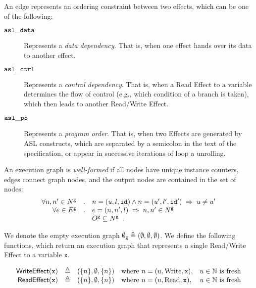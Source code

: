 An edge represents an ordering constraint between two effects, which can be one of the following:
\hypertarget{def-asldata}{}
\begin{description}
\item[$\mathtt{asl\_data}$] Represents a \emph{data dependency}.
That is, when one effect hands over its data to another effect.
\hypertarget{def-aslctrl}{}
\item[$\mathtt{asl\_ctrl}$] Represents a \emph{control dependency}.
That is, when a Read Effect to a variable determines the flow of control (e.g., which condition of a branch is taken),
which then leads to another Read/Write Effect.
\hypertarget{def-aslpo}{}
\item[$\mathtt{asl\_po}$] Represents a \emph{program order}.
That is, when two Effects are generated by ASL constructs, which are separated by a semicolon in the text of the specification,
or appear in successive iterations of loop a unrolling.
\end{description}

An execution graph is \emph{well-formed} if all nodes have unique instance counters, edges connect graph nodes,
and the output nodes are contained in the set of nodes:
\[
  \begin{array}{rcl}
  \forall n, n' \in N^{\textsf{g}} &.& n=(u,l,\texttt{id}) \wedge n=(u',l',\texttt{id}') \;\Rightarrow\; u \neq u' \\
  \forall e \in E^{\textsf{g}} &.& e=(n, n', l) \;\Rightarrow\; n, n' \in N^{\textsf{g}} \\
  & & O^{\textsf{g}} \subseteq N^{\textsf{g}} \enspace.
  \end{array}
\]
\hypertarget{def-emptygraph}{}

We denote the empty execution graph $\emptygraph \triangleq (\emptyset, \emptyset, \emptyset)$.
%
We define the following functions, which return an execution graph that represents a single Read/Write Effect to a variable \texttt{x}.
\hypertarget{def-writeeffect}{}
\hypertarget{def-readeffect}{}
\begin{definition}
\[
  \begin{array}{rclll}
    \WriteEffect(\vx) &\triangleq& (\{n\}, \emptyset, \{n\}) & \text{where } n=(u, \Write, \vx), & u\in\N \text{ is fresh}\\
    \ReadEffect(\vx)  &\triangleq& (\{n\}, \emptyset, \{n\}) & \text{where } n=(u, \Read, \vx),   & u\in\N \text{ is fresh}\\
  \end{array}
\]
\end{definition}

